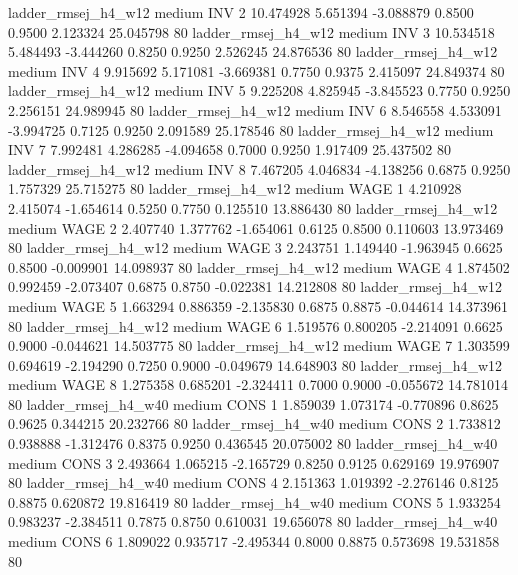    ladder_rmsej_h4_w12     medium      INV                 2 10.474928 5.651394 -3.088879 0.8500 0.9500  2.123324   25.045798 80
   ladder_rmsej_h4_w12     medium      INV                 3 10.534518 5.484493 -3.444260 0.8250 0.9250  2.526245   24.876536 80
   ladder_rmsej_h4_w12     medium      INV                 4  9.915692 5.171081 -3.669381 0.7750 0.9375  2.415097   24.849374 80
   ladder_rmsej_h4_w12     medium      INV                 5  9.225208 4.825945 -3.845523 0.7750 0.9250  2.256151   24.989945 80
   ladder_rmsej_h4_w12     medium      INV                 6  8.546558 4.533091 -3.994725 0.7125 0.9250  2.091589   25.178546 80
   ladder_rmsej_h4_w12     medium      INV                 7  7.992481 4.286285 -4.094658 0.7000 0.9250  1.917409   25.437502 80
   ladder_rmsej_h4_w12     medium      INV                 8  7.467205 4.046834 -4.138256 0.6875 0.9250  1.757329   25.715275 80
   ladder_rmsej_h4_w12     medium     WAGE                 1  4.210928 2.415074 -1.654614 0.5250 0.7750  0.125510   13.886430 80
   ladder_rmsej_h4_w12     medium     WAGE                 2  2.407740 1.377762 -1.654061 0.6125 0.8500  0.110603   13.973469 80
   ladder_rmsej_h4_w12     medium     WAGE                 3  2.243751 1.149440 -1.963945 0.6625 0.8500 -0.009901   14.098937 80
   ladder_rmsej_h4_w12     medium     WAGE                 4  1.874502 0.992459 -2.073407 0.6875 0.8750 -0.022381   14.212808 80
   ladder_rmsej_h4_w12     medium     WAGE                 5  1.663294 0.886359 -2.135830 0.6875 0.8875 -0.044614   14.373961 80
   ladder_rmsej_h4_w12     medium     WAGE                 6  1.519576 0.800205 -2.214091 0.6625 0.9000 -0.044621   14.503775 80
   ladder_rmsej_h4_w12     medium     WAGE                 7  1.303599 0.694619 -2.194290 0.7250 0.9000 -0.049679   14.648903 80
   ladder_rmsej_h4_w12     medium     WAGE                 8  1.275358 0.685201 -2.324411 0.7000 0.9000 -0.055672   14.781014 80
   ladder_rmsej_h4_w40     medium     CONS                 1  1.859039 1.073174 -0.770896 0.8625 0.9625  0.344215   20.232766 80
   ladder_rmsej_h4_w40     medium     CONS                 2  1.733812 0.938888 -1.312476 0.8375 0.9250  0.436545   20.075002 80
   ladder_rmsej_h4_w40     medium     CONS                 3  2.493664 1.065215 -2.165729 0.8250 0.9125  0.629169   19.976907 80
   ladder_rmsej_h4_w40     medium     CONS                 4  2.151363 1.019392 -2.276146 0.8125 0.8875  0.620872   19.816419 80
   ladder_rmsej_h4_w40     medium     CONS                 5  1.933254 0.983237 -2.384511 0.7875 0.8750  0.610031   19.656078 80
   ladder_rmsej_h4_w40     medium     CONS                 6  1.809022 0.935717 -2.495344 0.8000 0.8875  0.573698   19.531858 80
